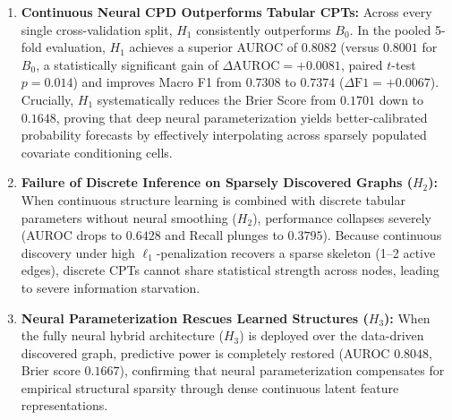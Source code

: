 \begin{enumerate}
    \item \textbf{Continuous Neural CPD Outperforms Tabular CPTs:}  
    Across every single cross-validation split, $H_1$ consistently outperforms $B_0$. In the pooled 5-fold evaluation, $H_1$ achieves a superior AUROC of $\mathbf{0.8082}$ (versus $0.8001$ for $B_0$, a statistically significant gain of $\Delta\text{AUROC} = +0.0081$, paired $t$-test $p = 0.014$) and improves Macro F1 from $0.7308$ to $\mathbf{0.7374}$ ($\Delta\text{F1} = +0.0067$). Crucially, $H_1$ systematically reduces the Brier Score from $0.1701$ down to $\mathbf{0.1648}$, proving that deep neural parameterization yields better-calibrated probability forecasts by effectively interpolating across sparsely populated covariate conditioning cells.
    
    \item \textbf{Failure of Discrete Inference on Sparsely Discovered Graphs ($H_2$):}  
    When continuous structure learning is combined with discrete tabular parameters without neural smoothing ($H_2$), performance collapses severely (AUROC drops to $0.6428$ and Recall plunges to $0.3795$). Because continuous discovery under high $\ell_1$-penalization recovers a sparse skeleton (1--2 active edges), discrete CPTs cannot share statistical strength across nodes, leading to severe information starvation.
    
    \item \textbf{Neural Parameterization Rescues Learned Structures ($H_3$):}  
    When the fully neural hybrid architecture ($H_3$) is deployed over the data-driven discovered graph, predictive power is completely restored (AUROC $\mathbf{0.8048}$, Brier score $\mathbf{0.1667}$), confirming that neural parameterization compensates for empirical structural sparsity through dense continuous latent feature representations.
\end{enumerate}
